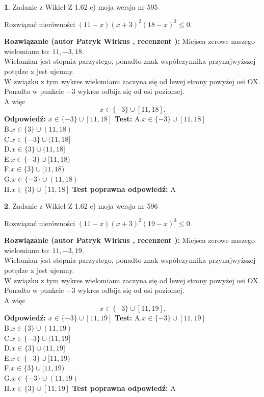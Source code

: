 \documentclass[12pt, a4paper]{article}
\theoremstyle{definition} %
\newtheorem{zad}{}
\newcommand{\zadStart}[1]{\begin{zad}#1\newline}
\newcommand{\zadStop}{\end{zad}}
\newcommand{\rozwStart}[2]{\noindent \textbf{Rozwiązanie (autor #1 , recenzent #2): }\newline}
\newcommand{\rozwStop}{\newline}
\newcommand{\odpStart}{\noindent \textbf{Odpowiedź:}\newline}
\newcommand{\odpStop}{\newline}
\newcommand{\testStart}{\noindent \textbf{Test:}\newline}
\newcommand{\testStop}{\newline}
\newcommand{\kluczStart}{\noindent \textbf{Test poprawna odpowiedź:}\newline}
\newcommand{\kluczStop}{\newline}
\begin{document}
\zadStart{Zadanie z Wikieł Z 1.62 c) moja wersja nr 595}

Rozwiązać nierówności $(11-x)(x+3)^{2}(18-x)^{3}\le0$.
\zadStop
\rozwStart{Patryk Wirkus}{}
Miejsca zerowe naszego wielomianu to: $11, -3, 18$.\\
Wielomian jest stopnia parzystego, ponadto znak współczynnika przy\linebreak najwyższej potędze x jest ujemny.\\ W związku z tym wykres wielomianu zaczyna się od lewej strony powyżej osi OX.\\
Ponadto w punkcie $-3$ wykres odbija się od osi poziomej.\\
A więc $$x \in \{-3\} \cup [11,18].$$
\rozwStop
\odpStart
$x \in \{-3\} \cup [11,18]$
\odpStop
\testStart
A.$x \in \{-3\} \cup [11,18]$\\
B.$x \in \{3\} \cup (11,18)$\\
C.$x \in \{-3\} \cup (11,18]$\\
D.$x \in \{3\} \cup (11,18]$\\
E.$x \in \{-3\} \cup [11,18)$\\
F.$x \in \{3\} \cup [11,18)$\\
G.$x \in \{-3\} \cup (11,18)$\\
H.$x \in \{3\} \cup [11,18]$
\testStop
\kluczStart
A
\kluczStop



\zadStart{Zadanie z Wikieł Z 1.62 c) moja wersja nr 596}

Rozwiązać nierówności $(11-x)(x+3)^{2}(19-x)^{3}\le0$.
\zadStop
\rozwStart{Patryk Wirkus}{}
Miejsca zerowe naszego wielomianu to: $11, -3, 19$.\\
Wielomian jest stopnia parzystego, ponadto znak współczynnika przy\linebreak najwyższej potędze x jest ujemny.\\ W związku z tym wykres wielomianu zaczyna się od lewej strony powyżej osi OX.\\
Ponadto w punkcie $-3$ wykres odbija się od osi poziomej.\\
A więc $$x \in \{-3\} \cup [11,19].$$
\rozwStop
\odpStart
$x \in \{-3\} \cup [11,19]$
\odpStop
\testStart
A.$x \in \{-3\} \cup [11,19]$\\
B.$x \in \{3\} \cup (11,19)$\\
C.$x \in \{-3\} \cup (11,19]$\\
D.$x \in \{3\} \cup (11,19]$\\
E.$x \in \{-3\} \cup [11,19)$\\
F.$x \in \{3\} \cup [11,19)$\\
G.$x \in \{-3\} \cup (11,19)$\\
H.$x \in \{3\} \cup [11,19]$
\testStop
\kluczStart
A
\kluczStop
\end{document}
